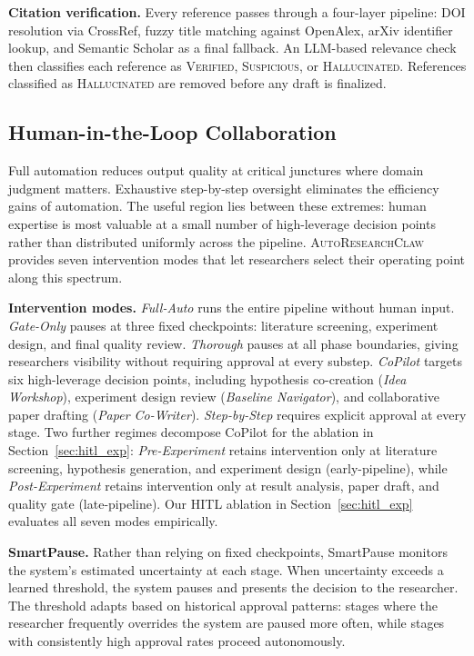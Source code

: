\documentclass{llmxive}
\providecommand{\system}{\textsc{AutoResearchClaw}}
\begin{document}
\noindent \textbf{Citation verification.}
Every reference passes through a four-layer pipeline: DOI resolution via CrossRef, fuzzy title matching against OpenAlex, arXiv identifier lookup, and Semantic Scholar as a final fallback.
An LLM-based relevance check then classifies each reference as \textsc{Verified}, \textsc{Suspicious}, or \textsc{Hallucinated}.
References classified as \textsc{Hallucinated} are removed before any draft is finalized.

\vspace{-0.3em}
\subsection{Human-in-the-Loop Collaboration}
\label{sec:hitl}
\vspace{-0.3em}

Full automation reduces output quality at critical junctures where domain judgment matters.
Exhaustive step-by-step oversight eliminates the efficiency gains of automation.
The useful region lies between these extremes: human expertise is most valuable at a small number of high-leverage decision points rather than distributed uniformly across the pipeline.
\system{} provides seven intervention modes that let researchers select their operating point along this spectrum.

\noindent \textbf{Intervention modes.}
\emph{Full-Auto} runs the entire pipeline without human input.
\emph{Gate-Only} pauses at three fixed checkpoints: literature screening, experiment design, and final quality review.
\emph{Thorough} pauses at all phase boundaries, giving researchers visibility without requiring approval at every substep.
\emph{CoPilot} targets six high-leverage decision points, including hypothesis co-creation (\emph{Idea Workshop}), experiment design review (\emph{Baseline Navigator}), and collaborative paper drafting (\emph{Paper Co-Writer}).
\emph{Step-by-Step} requires explicit approval at every stage.
Two further regimes decompose CoPilot for the ablation in Section~\ref{sec:hitl_exp}: \emph{Pre-Experiment} retains intervention only at literature screening, hypothesis generation, and experiment design (early-pipeline), while \emph{Post-Experiment} retains intervention only at result analysis, paper draft, and quality gate (late-pipeline).
Our HITL ablation in Section~\ref{sec:hitl_exp} evaluates all seven modes empirically.

\noindent \textbf{SmartPause.}
Rather than relying on fixed checkpoints, SmartPause monitors the system's estimated uncertainty at each stage.
When uncertainty exceeds a learned threshold, the system pauses and presents the decision to the researcher.
The threshold adapts based on historical approval patterns: stages where the researcher frequently overrides the system are paused more often, while stages with consistently high approval rates proceed autonomously.
\end{document}
